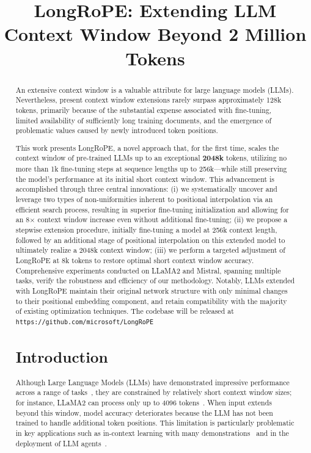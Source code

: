 \title{LongRoPE: Extending LLM Context Window Beyond 2 Million Tokens}

\begin{abstract}
An extensive context window is a valuable attribute for large language models (LLMs). Nevertheless, present context window extensions rarely surpass approximately 128k tokens, primarily because of the substantial expense associated with fine-tuning, limited availability of sufficiently long training documents, and the emergence of problematic values caused by newly introduced token positions.

This work presents LongRoPE, a novel approach that, for the first time, scales the context window of pre-trained LLMs up to an exceptional \textbf{2048k} tokens, utilizing no more than 1k fine-tuning steps at sequence lengths up to 256k—while still preserving the model’s performance at its initial short context window. This advancement is accomplished through three central innovations: (i) we systematically uncover and leverage two types of non-uniformities inherent to positional interpolation via an efficient search process, resulting in superior fine-tuning initialization and allowing for an 8$\times$ context window increase even without additional fine-tuning; (ii) we propose a stepwise extension procedure, initially fine-tuning a model at 256k context length, followed by an additional stage of positional interpolation on this extended model to ultimately realize a 2048k context window; (iii) we perform a targeted adjustment of LongRoPE at 8k tokens to restore optimal short context window accuracy. Comprehensive experiments conducted on LLaMA2 and Mistral, spanning multiple tasks, verify the robustness and efficiency of our methodology. Notably, LLMs extended with LongRoPE maintain their original network structure with only minimal changes to their positional embedding component, and retain compatibility with the majority of existing optimization techniques. The codebase will be released at \texttt{https://github.com/microsoft/LongRoPE}

\section{Introduction}

Although Large Language Models (LLMs) have demonstrated impressive performance across a range of tasks~\cite{gpt4,llama2}, they are constrained by relatively short context window sizes; for instance, LLaMA2 can process only up to 4096 tokens~\cite{llama2}. When input extends beyond this window, model accuracy deteriorates because the LLM has not been trained to handle additional token positions. This limitation is particularly problematic in key applications such as in-context learning with many demonstrations~\cite{Huang2023FewerIM} and in the deployment of LLM agents~\cite{park2023generative,madaan2023selfrefine}.


\end{abstract}
